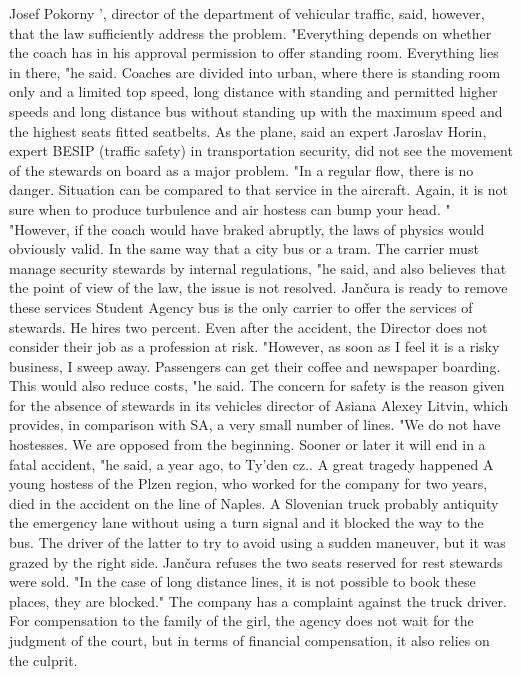 Josef Pokorny ', director of the department of vehicular traffic, said, however, that the law sufficiently address the problem.
"Everything depends on whether the coach has in his approval permission to offer standing room.
Everything lies in there, "he said.
Coaches are divided into urban, where there is standing room only and a limited top speed, long distance with standing and permitted higher speeds and long distance bus without standing up with the maximum speed and the highest seats fitted seatbelts.
As the plane, said an expert
Jaroslav Horin, expert BESIP (traffic safety) in transportation security, did not see the movement of the stewards on board as a major problem.
"In a regular flow, there is no danger. Situation can be compared to that service in the aircraft.
Again, it is not sure when to produce turbulence and air hostess can bump your head. "
"However, if the coach would have braked abruptly, the laws of physics would obviously valid.
In the same way that a city bus or a tram.
The carrier must manage security stewards by internal regulations, "he said, and also believes that the point of view of the law, the issue is not resolved.
Jančura is ready to remove these services
Student Agency bus is the only carrier to offer the services of stewards.
He hires two percent.
Even after the accident, the Director does not consider their job as a profession at risk.
"However, as soon as I feel it is a risky business, I sweep away.
Passengers can get their coffee and newspaper boarding.
This would also reduce costs, "he said.
The concern for safety is the reason given for the absence of stewards in its vehicles director of Asiana Alexey Litvin, which provides, in comparison with SA, a very small number of lines.
"We do not have hostesses. We are opposed from the beginning.
Sooner or later it will end in a fatal accident, "he said, a year ago, to Ty'den cz..
A great tragedy happened
A young hostess of the Plzen region, who worked for the company for two years, died in the accident on the line of Naples.
A Slovenian truck probably antiquity the emergency lane without using a turn signal and it blocked the way to the bus.
The driver of the latter to try to avoid using a sudden maneuver, but it was grazed by the right side.
Jančura refuses the two seats reserved for rest stewards were sold.
"In the case of long distance lines, it is not possible to book these places, they are blocked."
The company has a complaint against the truck driver.
For compensation to the family of the girl, the agency does not wait for the judgment of the court, but in terms of financial compensation, it also relies on the culprit.
